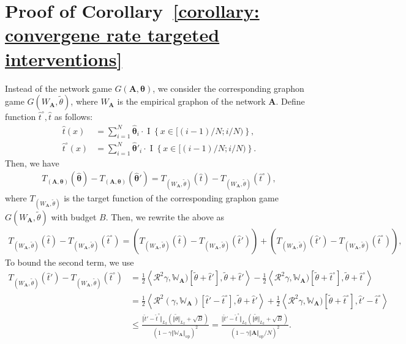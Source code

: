 \documentclass[11pt]{article}
\newcommand{\op}{\mathrm{op}}
\newcommand{\bA}{\bm{A}}
\newcommand{\btheta}{\bm{\theta}}
\newcommand{\bbW}{\mathbb{W}}
\newcommand{\cR}{\mathcal{R}}
\newcommand{\indicator}[1]{{\operatorname{I} \left \{ #1\right \}}}
\newcommand{\<}{\langle}
\renewcommand{\>}{\rangle}
\theoremstyle{plain}
\theoremstyle{definition}
\theoremstyle{remark}
\begin{document}
{\section{Proof of Corollary~\ref{corollary: convergene rate targeted interventions}}
\label{section: convergence rate targeted interventions}

Instead of the network game $G(\bA, \btheta)$, we consider the corresponding graphon game $G(W_{\bA}, \tilde{\theta})$, where $W_{\bA}$ is the empirical graphon of the network $\bA$. Define function $\hat{t}^\circ, \hat{t}$ as follows:
\begin{align*}
    \hat{t}(x) & = \sum_{i = 1}^N \hat{\btheta}_i \cdot \indicator{x \in [(i- 1)/N; i/N)}, \\
    \hat{t}^\circ(x) &= \sum_{i = 1}^N \hat{\btheta}'_i \cdot \indicator{x \in [(i- 1)/N; i/N)}.
\end{align*}
Then, we have
\begin{align*}
    T_{(\bA, \btheta)}(\hat{\btheta}) - T_{(\bA, \btheta)}(\hat{\btheta}') = T_{(W_{\bA}, \tilde{\theta})}(\hat{t}) - T_{(W_{\bA}, \tilde{\theta})}(\hat{t}^\circ),
\end{align*}
where $T_{(W_{\bA}, \tilde{\theta})}$ is the target function of the corresponding graphon game $G(W_{\bA}, \tilde{\theta})$ with budget $B$. Then, we rewrite the above as
\begin{align}
    T_{(W_{\bA}, \tilde{\theta})}(\hat{t}) - T_{(W_{\bA}, \tilde{\theta})}(\hat{t}^\circ) = \left (T_{(W_{\bA}, \tilde{\theta})}(\hat{t}) - T_{(W_{\bA}, \tilde{\theta})}(\hat{t}') \right ) + \left (T_{(W_{\bA}, \tilde{\theta})}(\hat{t}') - T_{(W_{\bA}, \tilde{\theta})}(\hat{t}^\circ) \right ), \label{eq: regret decomposition into discretezation and graphon error}
\end{align}
To bound the second term, we use
\begin{align}
\label{eq: discritization error - setup}
    T_{(W_{\bA}, \tilde{\theta})}(\hat{t}') - T_{(W_{\bA}, \tilde{\theta})}(\hat{t}^\circ) & = \frac{1}{2} \left \langle \cR^2\gamma, \bbW_{\bA})[\tilde{\theta} + \hat{t}'], \tilde{\theta} + \hat{t}' \right \rangle - \frac{1}{2} \left \langle \cR^2\gamma, \bbW_{\bA})[\tilde{\theta} + \hat{t}^\circ], \tilde{\theta} + \hat{t}^\circ \right \rangle \nonumber \\
    & =  \frac{1}{2}\left \langle \cR^2(\gamma, \bbW_{\bA})[\hat{t}' - \hat{t}^\circ], \tilde{\theta} + \hat{t}' \right \rangle + \frac{1}{2} \left \langle \cR^2\gamma, \bbW_{\bA})[\tilde{\theta} + \hat{t}^\circ], \hat{t}' - \hat{t}^\circ \right \rangle \nonumber \\
    & \le \frac{\Vert \hat{t}' - \hat{t}^\circ \Vert_{L_2} (\Vert \tilde{\theta} \Vert_{L_2} + \sqrt{B})}{(1 - \gamma \Vert \bbW_{\bA} \Vert_{\op})^2} = \frac{\Vert \hat{t}' - \hat{t}^\circ \Vert_{L_2} (\Vert \tilde{\theta} \Vert_{L_2} + \sqrt{B})}{(1 - \gamma \Vert \bA \Vert_{\op} / N)^2}.
\end{align}

}
\end{document}
